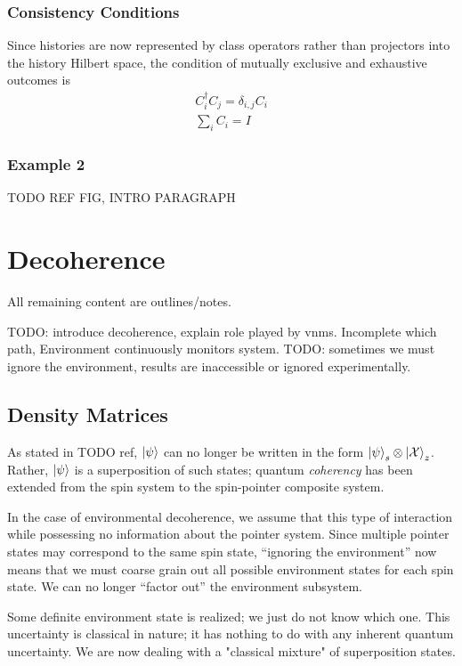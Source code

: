 \subsection{Consistency Conditions}

Since histories are now represented by class operators rather than projectors into the history Hilbert space, the condition of mutually exclusive and exhaustive outcomes is
\begin{align}
  C_i^\dagger C_j = \delta_{i,j} C_i \\
  \sum_i C_i = I
\end{align}

\subsection{Example 2}

TODO REF FIG, INTRO PARAGRAPH



\chapter{Decoherence}

All remaining content are outlines/notes.

TODO: introduce decoherence, explain role played by vnms. Incomplete which path, Environment continuously monitors system. TODO: sometimes we must ignore the environment, results are inaccessible or ignored experimentally.

\section{Density Matrices}
As stated in TODO ref, $\ket{\psi}$ can no longer be written in the form $\ket{\psi}_s \otimes \ket{\mathcal{X}}_z$. Rather, $\ket{\psi}$ is a superposition of such states; quantum \textit{coherency} has been extended from the spin system to the spin-pointer composite system.

In the case of environmental decoherence, we assume that this type of interaction while possessing no information about the pointer system. Since multiple pointer states may correspond to the same spin state, ``ignoring the environment'' now means that we must coarse grain out all possible environment states for each spin state. We can no longer ``factor out'' the environment subsystem.

Some definite environment state is realized; we just do not know which one. This uncertainty is classical in nature; it has nothing to do with any inherent quantum uncertainty. We are now dealing with a "classical mixture" of superposition states.

